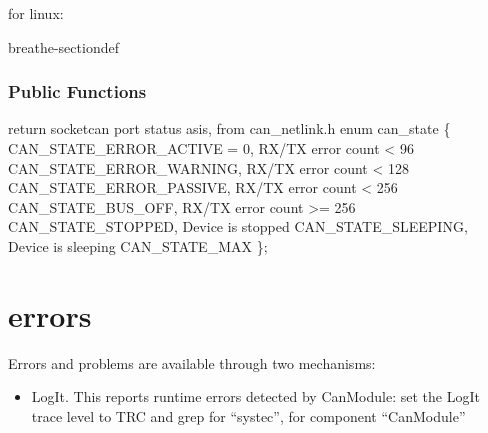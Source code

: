 \documentclass[a4paper,10pt,english]{sphinxmanual}
\begin{document}
\sphinxAtStartPar
for linux:

\begin{fulllineitems}
\label{\detokenize{vendors/systec:_CPPv412CSockCanScan}}%
\pysigstartmultiline
{}%
\pysigstopmultiline
\begin{sphinxuseclass}{breathe-sectiondef}\subsubsection*{Public Functions}

\begin{fulllineitems}
\label{\detokenize{vendors/systec:_CPPv4N12CSockCanScan13getPortStatusEv}}%
\pysigstartmultiline
{}%
\pysigstopmultiline
\sphinxAtStartPar
return socketcan port status as\sphinxhyphen{}is, from can\_netlink.h enum can\_state \{ CAN\_STATE\_ERROR\_ACTIVE = 0, RX/TX error count \textless{} 96 CAN\_STATE\_ERROR\_WARNING, RX/TX error count \textless{} 128 CAN\_STATE\_ERROR\_PASSIVE, RX/TX error count \textless{} 256 CAN\_STATE\_BUS\_OFF, RX/TX error count \textgreater{}= 256 CAN\_STATE\_STOPPED, Device is stopped CAN\_STATE\_SLEEPING, Device is sleeping CAN\_STATE\_MAX \}; 

\end{fulllineitems}


\end{sphinxuseclass}
\end{fulllineitems}



\section{errors}
\label{\detokenize{vendors/systec:errors}}
\sphinxAtStartPar
Errors and problems are available through two mechanisms:
\begin{itemize}
\item {} 
\sphinxAtStartPar
LogIt. This reports runtime errors detected by CanModule:
set the LogIt trace level to TRC and grep for “systec”, for component “CanModule”

\end{itemize}
\end{document}
